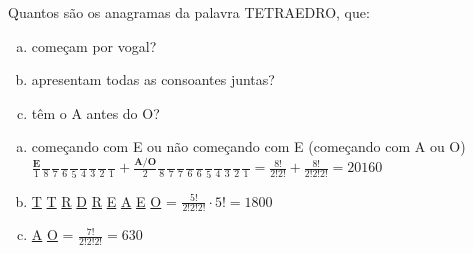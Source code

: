 \begin{ex}
 Quantos são os anagramas da palavra TETRAEDRO, que:
    \begin{enumerate}[(a)]
    \item começam por vogal?
    \item apresentam todas as consoantes juntas?
    \item têm o A antes do O?
    \end{enumerate}
     \begin{sol}
         \phantom{A} 
      \begin{enumerate} [(a)]
          \item começando com E ou não começando com E (começando com A ou O) \\ $\frac{\textbf{E}}{1}\frac{\phantom{A}}{8}\frac{\phantom{A}}{7}\frac{\phantom{A}}{6}\frac{\phantom{A}}{5}\frac{\phantom{A}}{4}\frac{\phantom{A}}{3}\frac{\phantom{A}}{2}\frac{\phantom{A}}{1}+\frac{\textbf{A/O}}{2}\frac{\phantom{A}}{8}\frac{\phantom{A}}{7}\frac{\phantom{A}}{7}\frac{\phantom{A}}{6}\frac{\phantom{A}}{6}\frac{\phantom{A}}{5}\frac{\phantom{A}}{4}\frac{\phantom{A}}{3}\frac{\phantom{A}}{2}\frac{\phantom{A}}{1}= \frac{8!}{2!2!}+\frac{8!}{2!2!2!}= 20160$
          \item  \underline{T} \underline{T} \underline{R} \underline{D} \underline{R} \underline{E} \underline{A} \underline{E} \underline{O} = $\frac{5!}{2!2!2!} \cdot 5!= 1800$
          \item \underline{A} \underline{O} \underline{\phantom{A}}
          \underline{\phantom{A}} \underline{\phantom{A}} \underline{\phantom{A}} \underline{\phantom{A}} \underline{\phantom{A}} \underline{\phantom{A}} =  $\frac{7!}{2!2!2!}= 630$
      \end{enumerate}
     \end{sol}
\end{ex}
